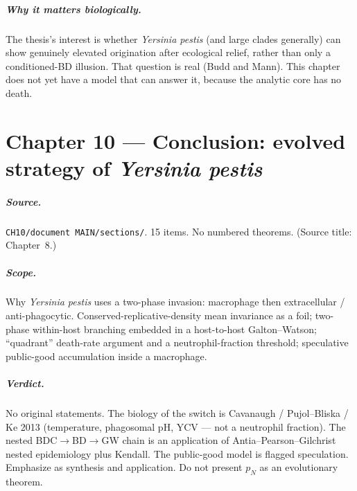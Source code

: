 \documentclass[11pt,a4paper]{report}
\newcommand{\yp}{\textit{Yersinia pestis}}
\begin{document}
\paragraph{Why it matters biologically.}
The thesis's interest is whether \yp{} (and large clades generally) can
show genuinely elevated origination after ecological relief, rather than
only a conditioned-BD illusion. That question is real (Budd and Mann).
This chapter does not yet have a model that can answer it, because the
analytic core has no death.

\chapter{Chapter 10 --- Conclusion: evolved strategy of \yp{}}
\label{ch:10}

\paragraph{Source.} \texttt{CH10/document MAIN/sections/}. 15 items.
No numbered theorems. (Source title: Chapter~8.)

\paragraph{Scope.}
Why \yp{} uses a two-phase invasion: macrophage then extracellular /
anti-phagocytic. Conserved-replicative-density mean invariance as a foil;
two-phase within-host branching embedded in a host-to-host
Galton--Watson; ``quadrant'' death-rate argument and a
neutrophil-fraction threshold; speculative public-good accumulation
inside a macrophage.

\paragraph{Verdict.}
No original statements. The biology of the switch is Cavanaugh /
Pujol--Bliska / Ke 2013 (temperature, phagosomal pH, YCV --- not a
neutrophil fraction). The nested BDC\(\to\)BD\(\to\)GW chain is an
application of Antia--Pearson--Gilchrist nested epidemiology plus
Kendall. The public-good model is flagged speculation. Emphasize as
synthesis and application. Do not present \(p_N\) as an evolutionary
theorem.
\end{document}
